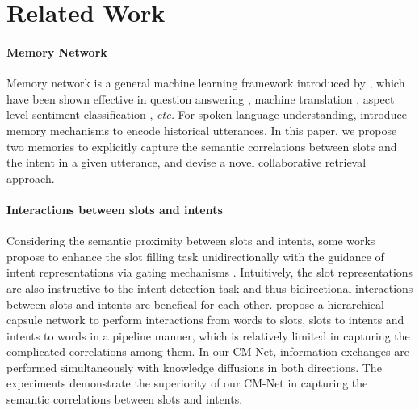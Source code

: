 \documentclass[11pt,a4paper]{article}
\begin{document}
\begin{table}[t!]
\begin{center}
\end{center}
\caption{Results on our CAIS dataset, where ``$\dagger$" indicates our implementation of the S-LSTM.}
\label{self_result}
\end{table}

\section{Related Work}
\paragraph{Memory Network} 
Memory network is a general machine learning framework introduced by \citeauthor{memory_2014} , which have been shown effective in question answering \cite{memory_2014,memory_2015}, machine translation \cite{memory_mt_2016,memory_mt_2017}, aspect level sentiment classification \cite{memory_absa_2016},  {\em etc.} For spoken language understanding, \citeauthor{memory_slu_2016}  introduce memory mechanisms to encode historical utterances. In this paper, we propose two memories to explicitly capture the semantic correlations between slots and the intent in a given utterance, and devise a novel collaborative retrieval approach.

\paragraph{Interactions between slots and intents}
Considering the semantic proximity between slots and intents, some works propose to enhance the slot filling task unidirectionally with the guidance of intent representations via gating mechanisms \cite{slot_gated_2018, self_attentive_2018}. Intuitively, the slot representations are also instructive to the intent detection task and thus bidirectional interactions between slots and intents are benefical for each other.
\citeauthor{capsule_2018}  propose a hierarchical capsule network to perform interactions from words to slots, slots to intents and intents to words in a pipeline manner, which is relatively limited in capturing the complicated correlations among them. In our CM-Net, information exchanges are performed simultaneously with knowledge diffusions in both directions. 
The experiments demonstrate the superiority of our CM-Net in capturing the semantic correlations between slots and intents.
\end{document}
